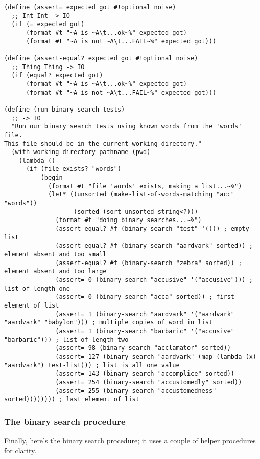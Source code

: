 \documentclass[12pt,openright,draft]{book}
\begin{document}
\begin{verbatim}
(define (assert= expected got #!optional noise)
  ;; Int Int -> IO
  (if (= expected got)
      (format #t "~A is ~A\t...ok~%" expected got)
      (format #t "~A is not ~A\t...FAIL~%" expected got)))

(define (assert-equal? expected got #!optional noise)
  ;; Thing Thing -> IO
  (if (equal? expected got)
      (format #t "~A is ~A\t...ok~%" expected got)
      (format #t "~A is not ~A\t...FAIL~%" expected got)))

(define (run-binary-search-tests)
  ;; -> IO
  "Run our binary search tests using known words from the 'words' file.
This file should be in the current working directory."
  (with-working-directory-pathname (pwd)
    (lambda ()
      (if (file-exists? "words")
          (begin
            (format #t "file 'words' exists, making a list...~%")
            (let* ((unsorted (make-list-of-words-matching "acc" "words"))
                   (sorted (sort unsorted string<?)))
              (format #t "doing binary searches...~%")
              (assert-equal? #f (binary-search "test" '())) ; empty list
              (assert-equal? #f (binary-search "aardvark" sorted)) ; element absent and too small
              (assert-equal? #f (binary-search "zebra" sorted)) ; element absent and too large
              (assert= 0 (binary-search "accusive" '("accusive"))) ; list of length one
              (assert= 0 (binary-search "acca" sorted)) ; first element of list
              (assert= 1 (binary-search "aardvark" '("aardvark" "aardvark" "babylon"))) ; multiple copies of word in list
              (assert= 1 (binary-search "barbaric" '("accusive" "barbaric"))) ; list of length two
              (assert= 98 (binary-search "acclamator" sorted))
              (assert= 127 (binary-search "aardvark" (map (lambda (x) "aardvark") test-list))) ; list is all one value
              (assert= 143 (binary-search "accomplice" sorted))
              (assert= 254 (binary-search "accustomedly" sorted))
              (assert= 255 (binary-search "accustomedness" sorted)))))))) ; last element of list
\end{verbatim}

\subsubsection{The binary search procedure}

Finally, here's the binary search procedure; it uses a couple of
helper procedures for clarity.
\end{document}
